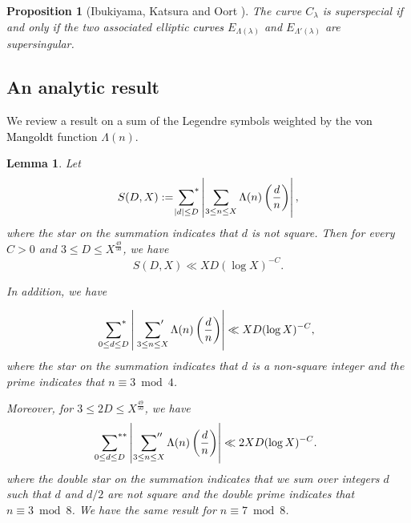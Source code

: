 \documentclass[10pt,a4paper]{amsart}
\theoremstyle{plain}
\newtheorem{prop}[defn]{Proposition}
\newtheorem{lem}[defn]{Lemma}
\newcommand{\lm}{\lambda}
\begin{document}
    
\begin{prop}[Ibukiyama, Katsura and Oort {\cite[Lemma 1.1 (),\ Proposition 1.3 (), ()]{IKO02}}]
\label{arigataya}
The curve $C_{\lm}$ is superspecial if and only if the two associated elliptic \textcolor{black}{curves} $E_{\Lambda(\lm)}$ and $ E_{{\Lambda}'(\lm)}$ are supersingular. 
\end{prop}

\subsection{An analytic result}
We review a result on a sum of the Legendre symbols weighted by the \textcolor{black}{von Mangoldt} function $\Lambda(n)$.

\begin{lem}
\label{jutila}
Let 
\[
S(D,X):=\sideset{}{^*} \sum_{|d| \le D} \left| \sum_{3 \le n \le X} \Lambda(n) \left( \frac{d}{n}\right) \right|,
\]
where the star on the summation indicates that $d$ is not square. Then for every $C>0$ and $3 \le D \le X^{\frac{49}{50}}$, we have 
\[
S(D,X) \ll XD(\log X)^{-C}.
\]

In addition, we have

\[
\sideset{}{^*} \sum_{0\le d \le D} \left| \  \sideset{}{'} \sum_{3 \le n \le X} \Lambda(n) \left( \frac{d}{n}\right) \right| \ll XD(\log X)^{-C},
\]
where the star on the summation indicates that $d$ is a non\textcolor{black}{-}square integer and the prime indicates that $n \equiv 3 \bmod 4$.

Moreover, for $3 \le 2D \le X^{\frac{49}{50}}$, we have
\[
\sideset{}{^{**}}\sum_{0\le d \le D} \left| \ \sideset{}{''} \sum_{3 \le n \le X} \Lambda(n) \left( \frac{d}{n}\right) \right| \ll  2XD(\log X)^{-C}.
\]
where the double star on the summation indicates that we sum over integers $d$ such that $d$ and $d/2$ are not square and the double prime indicates that $n \equiv 3 \bmod 8$. We have the same result for $n \equiv 7 \bmod 8$.
\end{lem}
\end{document}
